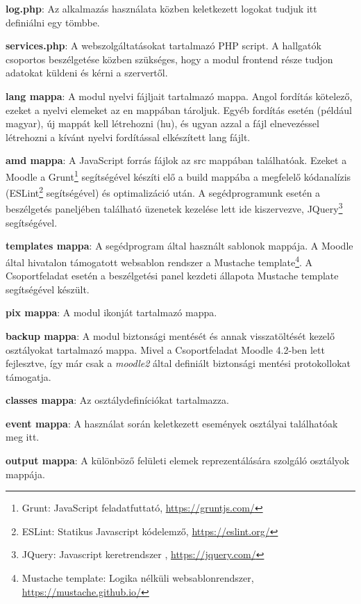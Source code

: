 \begin{compactitem}
\begin{compactitem}
        \item \textbf{log.php}: Az alkalmazás használata közben keletkezett logokat tudjuk itt definiálni egy tömbbe.
        \item \textbf{services.php}: A webszolgáltatásokat tartalmazó PHP script. A hallgatók csoportos beszélgetése közben szükséges, hogy a modul frontend része tudjon adatokat küldeni és kérni a szervertől.
    \end{compactitem}
    \item \textbf{lang mappa}: A modul nyelvi fájljait tartalmazó mappa. Angol fordítás kötelező, ezeket a nyelvi elemeket az en mappában tároljuk. Egyéb fordítás esetén (például magyar), új mappát kell létrehozni (hu), és ugyan azzal a fájl elnevezéssel létrehozni a kívánt nyelvi fordítással elkészített lang fájlt.
    \item \textbf{amd mappa}: A JavaScript forrás fájlok az src mappában találhatóak. Ezeket a Moodle a Grunt\footnote{Grunt: JavaScript feladatfuttató, \url{https://gruntjs.com/}} segítségével készíti elő a build mappába a megfelelő kódanalízis (ESLint\footnote{ESLint: Statikus Javascript kódelemző, \url{https://eslint.org/}} segítségével) és optimalizáció után. A segédprogramunk esetén a beszélgetés paneljében található üzenetek kezelése lett ide kiszervezve, JQuery\footnote{JQuery: Javascript keretrendszer , \url{https://jquery.com/}} segítségével.
    \item \textbf{templates mappa}: A segédprogram által használt sablonok mappája. A Moodle által hivatalon támogatott websablon rendszer a Mustache template\footnote{Mustache template: Logika nélküli websablonrendszer,  \url{https://mustache.github.io/}}. A Csoportfeladat esetén a beszélgetési panel kezdeti állapota Mustache template segítségével készült.
    \item \textbf{pix mappa}: A modul ikonját tartalmazó mappa.
    \item \textbf{backup mappa}: A modul biztonsági mentését és annak visszatöltését kezelő osztályokat tartalmazó mappa. Mivel a Csoportfeladat Moodle 4.2-ben lett fejlesztve, így már csak a \textit{moodle2} által definiált biztonsági mentési protokollokat támogatja.
    \item \textbf{classes mappa}: Az osztálydefiníciókat tartalmazza.
    \begin{compactitem}
        \item \textbf{event mappa}: A használat során keletkezett események osztályai találhatóak meg itt.
        \item \textbf{output mappa}: A különböző felületi elemek reprezentálására szolgáló osztályok mappája.

\end{compactitem}
\end{compactitem}
